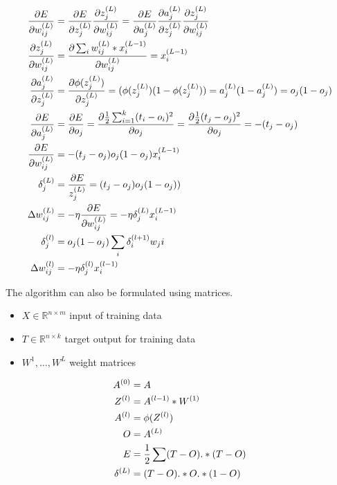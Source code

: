 \begin{align*}
\frac{\partial E}{\partial w_{ij}^{(L)}} &= \frac{\partial E}{\partial z_j^{(L)}} \frac{\partial z_j^{(L)}}{\partial w_{ij}^{(L)}}
= \frac{\partial E}{\partial a_j^{(L)}} \frac{\partial a_j^{(L)}}{\partial z_j^{(L)}} \frac{\partial z_j^{(L)}}{\partial w_{ij}^{(L)}}\\
\frac{\partial z_j^{(L)}}{\partial w_{ij}^{(L)}} &= \frac{\partial \sum_i w_{ij}^{(L)} * x_i^{(L-1)} }{\partial w_{ij}^{(L)}}
=  x_i^{(L-1)}\\
\frac{\partial a_j^{(L)}}{\partial z_j^{(L)}} &= \frac{\partial \phi(z_j^{(L)})}{\partial z_j^{(L)}}
= (\phi(z_j^{(L)}) (1 - \phi(z_j^{(L)}))
= a_j^{(L)} (1 - a_j^{(L)})
= o_j (1 - o_j)\\
\frac{\partial E}{\partial a_j^{(L)}} &= \frac{\partial E}{\partial o_j}
= \frac{\partial \frac{1}{2} \sum_{i=1}^k (t_i - o_i)^2}{\partial o_j}
= \frac{\partial \frac{1}{2} (t_j - o_j)^2}{\partial o_j}
= - (t_j - o_j)\\
\frac{\partial E}{\partial w_{ij}^{(L)}} &= - (t_j - o_j) o_j (1 - o_j) x_i^{(L-1)}\\
\delta_j^{(L)} &= \frac{\partial E}{z_j^{(L)}}
= (t_j - o_j) o_j (1 - o_j))\\
\Delta w_{ij}^{(L)} &= - \eta \frac{\partial E}{\partial w_{ij}^{(L)}}
= - \eta \delta_j^{(L)} x_i^{(L-1)}\\
\delta_j^{(l)} &= o_j (1 - o_j) \sum_i \delta_i^{(l+1)} w_ji\\
\Delta w_{ij}^{(l)} &= - \eta \delta_j^{(l)} x_i^{(l-1)}\\
\end{align*}

The algorithm can also be formulated using matrices.
\begin{itemize}
\item $X \in \mathbb{R}^{n \times m}$ input of training data
\item $T \in \mathbb{R}^{n \times k}$ target output for training data
\item $W^1,\dots,W^L$ weight matrices
\end{itemize}
\begin{align}
\begin{split}
A^{(0)} &= A\\
Z^{(l)} &= A^{(l-1)} * W^{(1)}\\
A^{(l)} &= \phi(Z^{(l)})\\
O &= A^{(L)}\\
E &= \frac{1}{2} \sum (T - O) .* (T - O)\\
\delta^{(L)} &= (T - O) .* O .* (1 - O)
\end{split}
\end{align}
